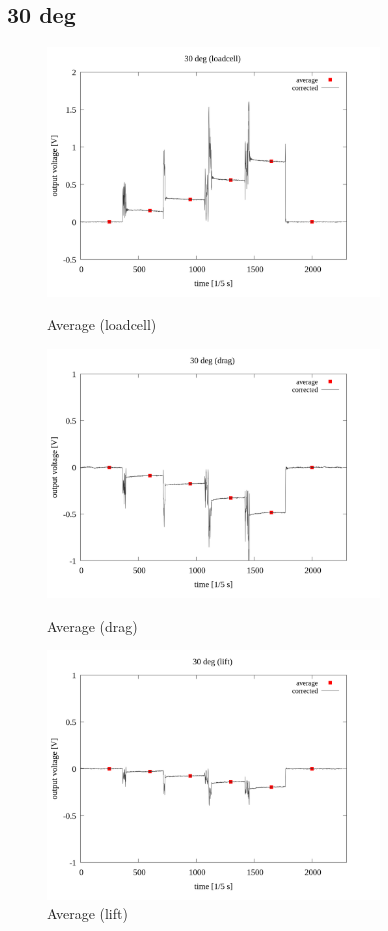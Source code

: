 \documentclass[twocolumn,a4j]{jsarticle}
\begin{document}
\newpage
\subsection{30 deg}
\begin{figure}[htbp]
    \footnotesize
    \begin{center}
        \includegraphics[width=88mm]{../images/average/30_loadcell_average.png}
        \caption{Average (loadcell)}
        \includegraphics[width=88mm]{../images/average/30_drag_average.png}
        \caption{Average (drag)}
        \includegraphics[width=88mm]{../images/average/30_lift_average.png}
        \caption{Average (lift)}
    \end{center}
\end{figure}
\end{document}
